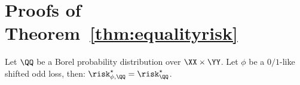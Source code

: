 









\section{Proofs of Theorem~\ref{thm:equalityrisk}}
\begin{lemma}
\label{lem:equalityriskstandard}
Let $\QQ$ be a Borel probability distribution over $\XX\times\YY$. Let ${\phi}$ be a $0/1$-like shifted odd loss, then: $\risk_{\phi,\QQ}^\star =\risk_{\QQ}^\star$.
\end{lemma}

